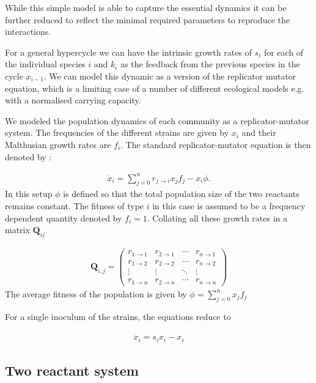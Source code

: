 While this simple model is able to capture the essential dynamics it can be further reduced to reflect the minimal required parameters to reproduce the interactions.

For a general hypercycle we can have the intrinsic growth rates of $s_i$ for each of the individual species $i$ and $k_i$ as the feedback from the previous species in the cycle $x_{i-1}$.
We can model this dynamic as a version of the replicator mutator equation, which is a limiting case of a number of different ecological models e.g. with a normalised carrying capacity.

We modeled the population dynamics of each community as a replicator-mutator system.
The frequencies of the different strains are given by $x_i$ and their Malthusian growth rates are $f_i$.
The standard replicator-mutator equation is then denoted by \citep{nowak:TREE:1992,nowak:book:2006}:

\begin{align}
	\dot{x}_i = \sum_{j=0}^{n} r_{j \rightarrow i} x_j f_j - x_i \phi.
\end{align}
In this setup $\phi$ is defined so that the total population size of the two reactants remains constant.
The fitness of type $i$ in this case is assumed to be a frequency dependent quantity denoted by $f_i = 1$. Collating all these growth rates in a matrix $\mathbf{Q}_{ij}$

\begin{align}
	\mathbf{Q}_{i,j} =
 \begin{pmatrix}
  r_{1 \rightarrow 1} & r_{2 \rightarrow 1} & \cdots & r_{n \rightarrow 1} \\
  r_{1 \rightarrow 2} & r_{2 \rightarrow 2} & \cdots & r_{n \rightarrow 2} \\
  \vdots  & \vdots  & \ddots & \vdots  \\
  r_{1 \rightarrow n} & r_{2 \rightarrow n} & \cdots & r_{n \rightarrow n} 
 \end{pmatrix}
\end{align}
The average fitness of the population is given by $\phi = \sum_{j=0}^{n} x_j f_j$

For a single inoculum of the strains, the equations reduce to

\begin{align}
	\dot{x}_i =  s_i x_i - x_i
\end{align}

\subsection{Two reactant system}

